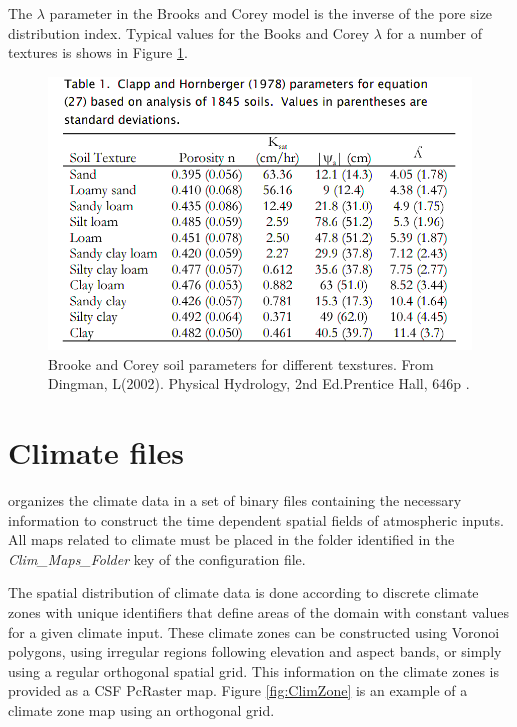 The $\lambda$ parameter in the Brooks and Corey model is the inverse of the pore size distribution index. Typical values for the Books and Corey $\lambda$ for a number of textures is shows in Figure \ref{fig:BCValues}.

\begin{center}
\begin{figure}
\includegraphics[width=1\textwidth]{./figures/BCParameters.png} 
\caption{Brooke and Corey soil parameters for different texstures. From Dingman, L(2002). Physical Hydrology, 2nd Ed.Prentice Hall, 646p .}\label{fig:BCValues}
\end{figure}
\end{center}


\section{Climate files}

\echo organizes the climate data in a set of binary files containing the necessary information to construct the time dependent spatial fields of atmospheric inputs. All maps related to climate must be placed in the folder identified in the \emph{Clim\_Maps\_Folder} key of the configuration file.

The spatial distribution of climate data is done according to discrete climate zones with unique identifiers that define areas of the domain with constant values for a given climate input. These climate zones can be constructed using Voronoi polygons, using irregular regions following elevation and aspect bands, or simply using a regular orthogonal spatial grid. This information on the climate zones is provided as a CSF PcRaster map. Figure \ref{fig:ClimZone} is an example of a climate zone map using an orthogonal grid.

